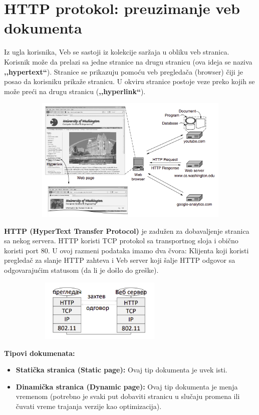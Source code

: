 \documentclass[a4paper]{article}
\begin{document}
\section{HTTP protokol: preuzimanje veb dokumenta}
    Iz ugla korisnika, Veb se sastoji iz kolekcije saržaja u obliku veb stranica. Korisnik
    može da prelazi sa jedne stranice na drugu stranicu (ova ideja se naziva \textbf{,,hypertext``}).
    Stranice se prikazuju pomoću veb pregledača (browser) čiji je posao da korisniku prikaže stranicu.
    U okviru stranice postoje veze preko kojih se može preći na drugu stranicu (\textbf{,,hyperlink``}).
    \begin{figure}[H]
        \begin{center}
            \includegraphics[width=120mm,height=60mm]{Slike/http1.png}
        \end{center}
    \end{figure}
    \indent \textbf{HTTP (HyperText Transfer Protocol)} je zadužen za dobavaljenje stranica 
    sa nekog servera. HTTP koristi TCP protokol sa transportnog sloja i obično koristi port 80.
    U ovoj razmeni podataka imamo dva čvora: Klijenta koji koristi pregledač za slanje HTTP
    zahteva i Veb server koji šalje HTTP odgovor sa odgovarajućim statusom (da li je došlo do greške).
    \begin{figure}[H]
        \begin{center}
            \includegraphics[width=80mm,height=30mm]{Slike/http2.png}
        \end{center}
    \end{figure}
    \textbf{Tipovi dokumenata:}
    \begin{itemize}
        \item \textbf{Statička stranica (Static page):} Ovaj tip dokumenta je uvek isti.
        \item \textbf{Dinamička stranica (Dynamic page):} Ovaj tip dokumenta je menja vremenom 
              (potrebno je svaki put dobaviti stranicu u slučaju promena ili čuvati vreme
              trajanja verzije kao optimizacija).
    \end{itemize}
\end{document}
